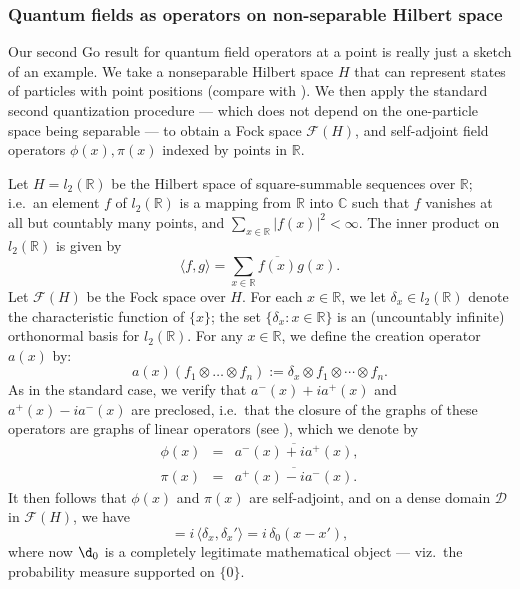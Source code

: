 \documentclass[12pt]{article}
\newcommand{\abs}[1]{|#1|}
\theoremstyle{definition}
\theoremstyle{definition}
\theoremstyle{remark}
\def\2#1{{\mathcal #1}}
\def\7#1{{\mathbb #1}}
\begin{document}
\subsubsection{Quantum fields as operators on non-separable Hilbert space}
\label{aleph}

Our second Go result for quantum field operators at a point is really just a sketch
of an example.  We take a nonseparable Hilbert space $H$ that can represent states of
particles with point positions (compare with \cite{hans}).  We then apply the
standard second quantization procedure --- which does not depend on the one-particle
space being separable --- to obtain a Fock space $\2F (H)$, and self-adjoint field
operators $\phi (x),\pi (x)$ indexed by points in $\7R$.

Let $H=l_2(\mathbb{R})$ be the Hilbert space of square-summable sequences over $\7R$;
i.e.\ an element $f$ of $l_2(\7R )$ is a mapping from $\7R$ into $\7C$ such that $f$
vanishes at all but countably many points, and $\sum _{x\in
  \mathbb{R}}\abs{f(x)}^{2}<\infty $.  The inner product on $l_2(\mathbb{R})$ is
given by
\begin{equation}
  \langle f,g\rangle = \sum _{x\in \mathbb{R}}\overline{f(x)}g(x)
  .\end{equation} 
Let $\2F (H)$ be the Fock space over $H$.  For each $x\in
\mathbb{R}$, we let $\delta _x \in l_2(\7R )$ denote the
characteristic function of $\{ x\}$; the set $\{ \delta _x:x\in
\mathbb{R}\}$ is an (uncountably infinite) orthonormal basis for
$l_2(\mathbb{R})$.  For any $x\in \7R$, we define the creation
operator $a(x)$ by:
\begin{equation}
  a(x)(f_1\otimes \dots \otimes f_n) := \delta _x \otimes f_1 \otimes \cdots \otimes
  f_n .\end{equation}
As in the standard case, we verify that $a^-(x)+ia^+(x)$ and
$a^{+}(x)-ia^-(x)$ are preclosed, i.e.\
that the closure of the graphs of these operators are
graphs of linear operators (see \cite[p.\ 155]{kr}), which we denote by 
\begin{eqnarray}
  \phi (x) &= & \overline{a^-(x)+ia^+(x)} , \\
  \pi (x) &= & \overline{a^+(x)-ia^-(x)} .\end{eqnarray}
It then follows that $\phi (x)$ and $\pi (x)$ are self-adjoint, and on a dense domain
$\2D$ in $\2F (H)$, we have 
\begin{equation} [\pi (x) ,\phi (x')]= i \,\langle\delta _x,\delta
  _x'\rangle = i\,\delta _0(x-x') ,\end{equation} where now $\d _0$ is
a completely legitimate mathematical object --- viz.\ the probability
measure supported on $\{ 0\}$.
\end{document}

